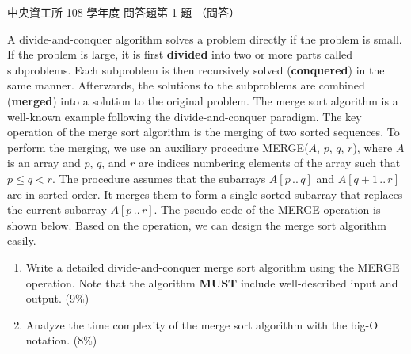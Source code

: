 \begin{pastexam}[label={px:ncu-108-dsa-13}]{中央資工所 108 學年度 問答題第 1 題}
（問答）

A divide-and-conquer algorithm solves a problem directly if the problem is small. If the problem is
large, it is first \textbf{divided} into two or more parts called subproblems. Each subproblem is then
recursively solved (\textbf{conquered}) in the same manner. Afterwards, the solutions to the
subproblems are combined (\textbf{merged}) into a solution to the original problem. The merge sort
algorithm is a well-known example following the divide-and-conquer paradigm. The key operation of
the merge sort algorithm is the merging of two sorted sequences. To perform the merging, we use an
auxiliary procedure MERGE($A$, $p$, $q$, $r$), where $A$ is an array and $p$, $q$, and $r$ are indices
numbering elements of the array such that $p \le q < r$. The procedure assumes that the subarrays
$A[p \,..\, q]$ and $A[q+1 \,..\, r]$ are in sorted order. It merges them to form a single sorted
subarray that replaces the current subarray $A[p \,..\, r]$. The pseudo code of the MERGE operation is
shown below. Based on the operation, we can design the merge sort algorithm easily.
\begin{enumerate}[label=(\alph*)]
\item Write a detailed divide-and-conquer merge sort algorithm using the MERGE operation. Note that
the algorithm \textbf{MUST} include well-described input and output. (9\%)
\item Analyze the time complexity of the merge sort algorithm with the big-O notation. (8\%)
\end{enumerate}


\end{pastexam}
